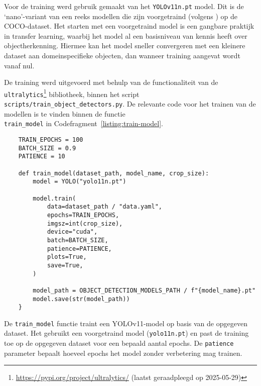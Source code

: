 Voor de training werd gebruik gemaakt van het \texttt{YOLOv11n.pt} model. 
Dit is de `nano'-variant van een reeks modellen die zijn voorgetraind (volgens \textcite{Khanam2024}) op de COCO-dataset.
Het starten met een voorgetraind model is een gangbare praktijk in transfer learning, waarbij het model 
al een basisniveau van kennis heeft over objectherkenning.
Hiermee kan het model sneller convergeren met een kleinere dataset aan domeinspecifieke objecten, dan wanneer training aangevat wordt vanaf nul.

De training werd uitgevoerd met behulp van de functionaliteit van de \texttt{ultralytics}\footnote{\url{https://pypi.org/project/ultralytics/} (laatst geraadpleegd op 2025-05-29)} bibliotheek, 
binnen het script \texttt{scripts/train\_object\_detectors.py}.
De relevante code voor het trainen van de modellen is te vinden binnen de functie\\ \texttt{train\_model} in Codefragment~\ref{listing:train-model}.

\begin{listing}[H]
  \begin{verbatim}
    TRAIN_EPOCHS = 100
    BATCH_SIZE = 0.9
    PATIENCE = 10

    def train_model(dataset_path, model_name, crop_size):
        model = YOLO("yolo11n.pt")

        model.train(
            data=dataset_path / "data.yaml",
            epochs=TRAIN_EPOCHS,
            imgsz=int(crop_size),
            device="cuda",
            batch=BATCH_SIZE,
            patience=PATIENCE,
            plots=True,
            save=True,
        )

        model_path = OBJECT_DETECTION_MODELS_PATH / f"{model_name}.pt"
        model.save(str(model_path))
    }
  \end{verbatim}
  \caption[Functie voor het trainen van YOLOv11-modellen]{
    \label{listing:train-model}
    De \texttt{train\_model} functie traint een YOLOv11-model op basis van de opgegeven dataset.
    Het gebruikt een voorgetraind model (\texttt{yolo11n.pt}) en past de training toe op de opgegeven dataset voor een bepaald aantal epochs.
    De \texttt{patience} parameter bepaalt hoeveel epochs het model zonder verbetering mag trainen.
  }
\end{listing}

